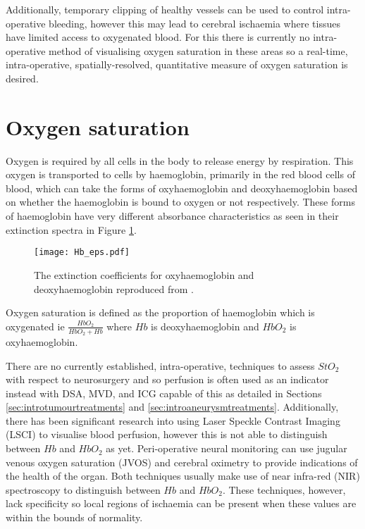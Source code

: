 Additionally, temporary clipping of healthy vessels can be used to control intra-operative bleeding, however this may lead to cerebral ischaemia where tissues have limited access to oxygenated blood\cite{Doron2022}. For this there is currently no intra-operative method of visualising oxygen saturation in these areas so a real-time, intra-operative, spatially-resolved, quantitative measure of oxygen saturation is desired. 

\section{Oxygen saturation}
Oxygen is required by all cells in the body to release energy by respiration. This oxygen is transported to cells by haemoglobin, primarily in the red blood cells of blood, which can take the forms of oxyhaemoglobin and deoxyhaemoglobin based on whether the haemoglobin is bound to oxygen or not respectively. These forms of haemoglobin have very different absorbance characteristics as seen in their extinction spectra in Figure \ref{fig:Haemoglobinext}. 
\begin{figure}[h]
    \centering 
    \texttt{[image: Hb\_eps.pdf]}
    \caption{The extinction coefficients for oxyhaemoglobin and deoxyhaemoglobin reproduced from \cite{Prahl1998}.}
    \label{fig:Haemoglobinext}
\end{figure}
Oxygen saturation is defined as the proportion of haemoglobin which is oxygenated ie $\frac{HbO_2}{HbO_2 + Hb}$ where $Hb$ is deoxyhaemoglobin and $HbO_2$ is oxyhaemoglobin. 

There are no currently established, intra-operative, techniques to assess $StO_2$ with respect to neurosurgery and so perfusion is often used as an indicator instead with DSA, MVD, and ICG capable of this as detailed in Sections \ref{sec:introtumourtreatments} and \ref{sec:introaneurysmtreatments}. Additionally, there has been significant research into using Laser Speckle Contrast Imaging (LSCI) to visualise blood perfusion, however this is not able to distinguish between $Hb$ and $HbO_2$ as yet\cite{Dunn2012}. Peri-operative neural monitoring can use jugular venous oxygen saturation (JVOS)\cite{Raith2020} and cerebral oximetry\cite{Lian2020} to provide indications of the health of the organ. Both techniques usually make use of near infra-red (NIR) spectroscopy to distinguish between $Hb$ and $HbO_2$. These techniques, however, lack specificity so local regions of ischaemia can be present when these values are within the bounds of normality\cite{Raith2020}.

